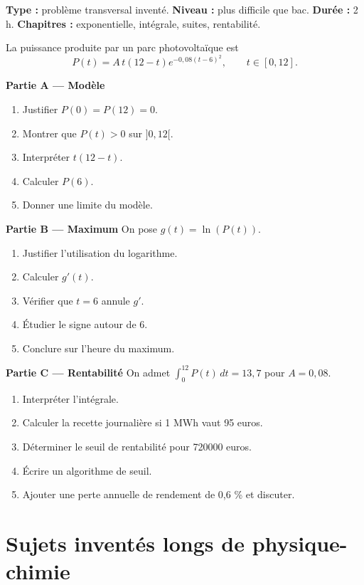 \documentclass[11pt,a4paper]{article}
\begin{document}
\hypertarget{M-LONG-07}{}
\begin{difficile}
\textbf{Type :} problème transversal inventé.  
\textbf{Niveau :} plus difficile que bac.  
\textbf{Durée :} 2 h.  
\textbf{Chapitres :} exponentielle, intégrale, suites, rentabilité.

La puissance produite par un parc photovoltaïque est
\[
P(t)=A\,t(12-t)e^{-0{,}08(t-6)^2},\qquad t\in[0,12].
\]

\textbf{Partie A — Modèle}
\begin{enumerate}
  \item Justifier $P(0)=P(12)=0$.
  \item Montrer que $P(t)>0$ sur $]0,12[$.
  \item Interpréter $t(12-t)$.
  \item Calculer $P(6)$.
  \item Donner une limite du modèle.
\end{enumerate}

\textbf{Partie B — Maximum}
On pose $g(t)=\ln(P(t))$.
\begin{enumerate}
  \item Justifier l'utilisation du logarithme.
  \item Calculer $g'(t)$.
  \item Vérifier que $t=6$ annule $g'$.
  \item Étudier le signe autour de 6.
  \item Conclure sur l'heure du maximum.
\end{enumerate}

\textbf{Partie C — Rentabilité}
On admet $\int_0^{12}P(t)\,dt=13{,}7$ pour $A=0{,}08$.
\begin{enumerate}
  \item Interpréter l'intégrale.
  \item Calculer la recette journalière si 1 MWh vaut 95 euros.
  \item Déterminer le seuil de rentabilité pour 720000 euros.
  \item Écrire un algorithme de seuil.
  \item Ajouter une perte annuelle de rendement de 0,6 \% et discuter.
\end{enumerate}
\end{difficile}

\section{Sujets inventés longs de physique-chimie}
\end{document}
